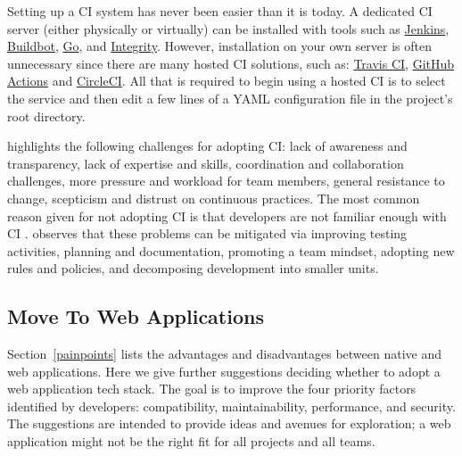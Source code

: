 \documentclass[final, 3p, times, authoryear]{elsarticle}
\begin{document}
Setting up a CI system has never been easier than it is today.  A dedicated CI
server (either physically or virtually) can be installed with tools such as
\href{https://www.jenkins.io/} {Jenkins}, \href{http://buildbot.net/}
{Buildbot}, \href{https://www.gocd.org/} {Go}, and
\href{http://integrity.github.io/} {Integrity}. However, installation on your
own server is often unnecessary since there are many hosted CI solutions, such
as: \href{https://travis-ci.org/} {Travis CI},
\href{https://github.com/features/actions} {GitHub Actions} and
\href{https://circleci.com/} {CircleCI}.  All that is required to begin using a
hosted CI is to select the service and then edit a few lines of a YAML
configuration file in the project's root directory.

\citet{ShahinEtAl2017} highlights the following challenges for adopting CI: lack
of awareness and transparency, lack of expertise and skills, coordination and
collaboration challenges, more pressure and workload for team members, general
resistance to change, scepticism and distrust on continuous practices. The most
common reason given for not adopting CI is that developers are not familiar
enough with CI \citep{HiltonEtAl2016}.  \citet{ShahinEtAl2017} observes that
these problems can be mitigated via improving testing activities, planning and
documentation, promoting a team mindset, adopting new rules and policies, and
decomposing development into smaller units.

\subsection{Move To Web Applications} \label{sec_recommendations_tech_stack}

Section~\ref{painpoints} lists the advantages and disadvantages between native
and web applications. Here we give further suggestions deciding whether to adopt
a web application tech stack.  The goal is to improve the four priority factors
identified by developers: compatibility, maintainability, performance, and
security.  The suggestions are intended to provide ideas and avenues for
exploration; a web application might not be the right fit for all projects and
all teams.
\end{document}
